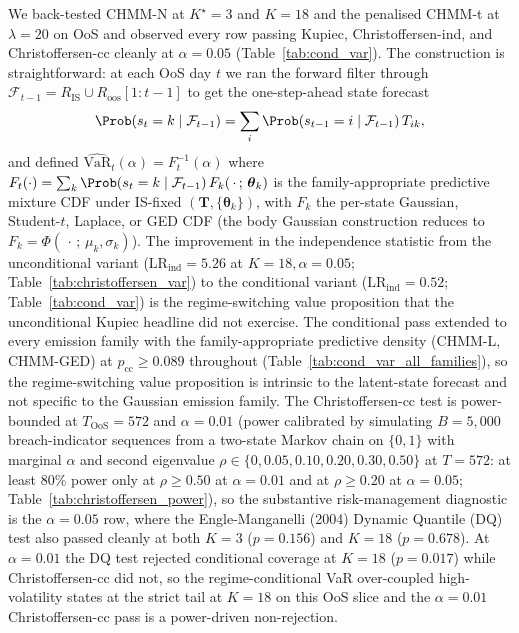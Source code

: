 We back-tested CHMM-N at $K^\star = 3$ and $K = 18$ and the penalised CHMM-t at $\lambda = 20$ on OoS and observed every row passing Kupiec, Christoffersen-ind, and Christoffersen-cc cleanly at $\alpha = 0.05$ (Table~\ref{tab:cond_var}). The construction is straightforward: at each OoS day $t$ we ran the forward filter through $\mathcal F_{t-1} = R_{\text{IS}} \cup R_{\text{oos}}[1{:}t-1]$ to get the one-step-ahead state forecast
\begin{equation}
    \Prob(s_t = k \mid \mathcal F_{t-1}) = \sum_i \Prob(s_{t-1} = i \mid \mathcal F_{t-1})\, T_{ik},
    \label{eq:filter}
\end{equation}
and defined $\widehat{\text{VaR}}_t(\alpha) = F_t^{-1}(\alpha)$ where $F_t(\cdot) = \sum_k \Prob(s_t = k \mid \mathcal F_{t-1})\, F_k(\,\cdot\,;\, \boldsymbol\theta_k)$ is the family-appropriate predictive mixture CDF under IS-fixed $(\mathbf T, \{\boldsymbol\theta_k\})$, with $F_k$ the per-state Gaussian, Student-$t$, Laplace, or GED CDF (the body Gaussian construction reduces to $F_k = \Phi(\,\cdot\,;\, \mu_k, \sigma_k)$). The improvement in the independence statistic from the unconditional variant ($\text{LR}_{\text{ind}} = 5.26$ at $K = 18, \alpha = 0.05$; Table~\ref{tab:christoffersen_var}) to the conditional variant ($\text{LR}_{\text{ind}} = 0.52$; Table~\ref{tab:cond_var}) is the regime-switching value proposition that the unconditional Kupiec headline did not exercise. The conditional pass extended to every emission family with the family-appropriate predictive density (CHMM-L, CHMM-GED) at $p_{\text{cc}} \ge 0.089$ throughout (Table~\ref{tab:cond_var_all_families}), so the regime-switching value proposition is intrinsic to the latent-state forecast and not specific to the Gaussian emission family. The Christoffersen-cc test is power-bounded at $T_{\text{OoS}} = 572$ and $\alpha = 0.01$ (power calibrated by simulating $B = 5{,}000$ breach-indicator sequences from a two-state Markov chain on $\{0, 1\}$ with marginal $\alpha$ and second eigenvalue $\rho \in \{0, 0.05, 0.10, 0.20, 0.30, 0.50\}$ at $T = 572$: at least $80\%$ power only at $\rho \ge 0.50$ at $\alpha = 0.01$ and at $\rho \ge 0.20$ at $\alpha = 0.05$; Table~\ref{tab:christoffersen_power}), so the substantive risk-management diagnostic is the $\alpha = 0.05$ row, where the Engle-Manganelli (2004) Dynamic Quantile (DQ) test also passed cleanly at both $K = 3$ ($p = 0.156$) and $K = 18$ ($p = 0.678$). At $\alpha = 0.01$ the DQ test rejected conditional coverage at $K = 18$ ($p = 0.017$) while Christoffersen-cc did not, so the regime-conditional VaR over-coupled high-volatility states at the strict tail at $K = 18$ on this OoS slice and the $\alpha = 0.01$ Christoffersen-cc pass is a power-driven non-rejection.

